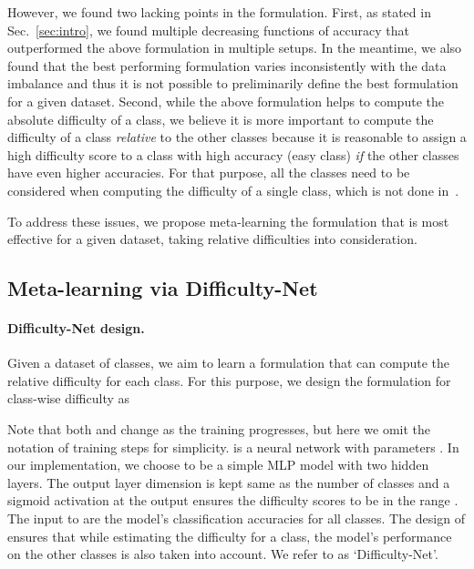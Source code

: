 \documentclass[10pt,twocolumn,letterpaper]{article}
\begin{document}
However, we found two lacking points in 
the formulation. 
First, as stated in Sec.~\ref{sec:intro}, we found multiple decreasing functions of accuracy  that outperformed the above formulation in multiple setups.
In the meantime, we also found that the best performing formulation varies inconsistently with the data imbalance and thus it is not possible to preliminarily define the best formulation for a given dataset. 
Second, while the above formulation helps to compute the absolute difficulty of a class, we believe it is more important to compute the difficulty of a class {\it relative} to the other classes because it is reasonable to assign a high difficulty score to a class with high accuracy (\ie easy class) {\it if} the other classes have even higher accuracies. 
For that purpose, all the classes need to be considered when computing the difficulty of a single class, which is not done in~\cite{cdb-ce}. 


To address these issues, we propose meta-learning the formulation that is most effective for a given dataset, taking relative difficulties into consideration.



\subsection{Meta-learning via Difficulty-Net}\label{sec:meta-learning_via_difficulty-net}
\paragraph{Difficulty-Net design.}\label{difficultynet design}
Given a dataset of  classes, we aim to learn a formulation that can compute the relative difficulty for each class. For this purpose, we design the formulation for class-wise difficulty as 

Note that both  and  change as the training progresses, but here we omit the notation of training steps for simplicity.
 is a neural network with parameters . 
In our implementation, we choose  to be a simple MLP model with two hidden layers.
The output layer dimension is kept same as the number of classes and
a sigmoid activation at the output ensures the difficulty scores to be in the range .
The input to  are the model's classification accuracies for all  classes. The design of  ensures that while estimating the difficulty for a class, the model's performance on the other classes is also taken into account. We refer to  as `Difficulty-Net'.
\end{document}
